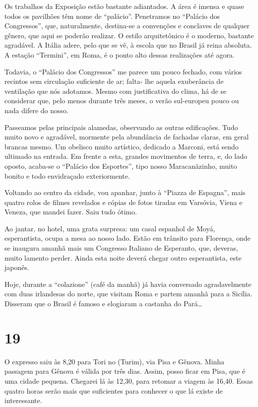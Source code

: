 Os trabalhos da Exposição estão bastante adiantados. A área é imensa e quase todos os pavilhões têm nome de “palácio”. Penetramos no “Palácio dos Congressos”, que, naturalmente, destina-se a convenções e conclaves de qualquer gênero, que aqui se poderão realizar. O estilo arquitetônico é o moderno, bastante agradável. A Itália adere, pelo que se vê, à escola que no Brasil já reina absoluta. A estação “Termini”, em Roma, é o ponto alto dessas realizações até agora.

Todavia, o “Palácio dos Congressos” me parece um pouco fechado, com vários recintos sem circulação suficiente de ar; falta- lhe aquela exuberância de ventilação que nós adotamos. Mesmo com justificativa do clima, há de se considerar que, pelo menos durante três meses, o verão sul-europeu pouco ou nada difere do nosso.

Passeamos pelas principais alamedas, observando as outras edificações. Tudo muito novo e agradável, mormente pela abundância de fachadas claras, em geral brancas mesmo. Um obelisco muito artístico, dedicado a Marconi, está sendo ultimado na entrada. Em frente a esta, grandes movimentos de terra, e, do lado oposto, acaba-se o “Palácio dos Esportes”, tipo nosso Maracanãzinho, muito bonito e todo envidraçado exteriormente.

Voltando ao centro da cidade, vou apanhar, junto à “Piazza de Espagna”, mais quatro rolos de filmes revelados e cópias de fotos tiradas em Varsóvia, Viena e Veneza, que mandei fazer. Saiu tudo ótimo.

Ao jantar, no hotel, uma grata surpresa: um casal espanhol de Moyá, esperantista, ocupa a mesa ao nosso lado. Estão em trânsito para Florença, onde se inaugura amanhã mais um Congresso Italiano de Esperanto, que, deveras, muito lamento perder. Ainda esta noite deverá chegar outro esperantista, este japonês.

Hoje, durante a “colazione” (café da manhã) já havia conversado agradavelmente com duas irlandesas do norte, que visitam Roma e partem amanhã para a Sicília. Disseram que o Brasil é famoso e elogiaram a castanha do Pará\ldots

\section*{19 \adfflatleafright {}}
O expresso saiu às 8,20 para Tori no (Turim), via Pisa e Gênova. Minha passagem para Gênova é válida por três dias. Assim, posso ficar em Pisa, que é uma cidade pequena. Chegarei lá às 12,30, para retomar a viagem às 16,40. Essas quatro horas serão mais que suficientes para conhecer o que lá existe de interessante.

